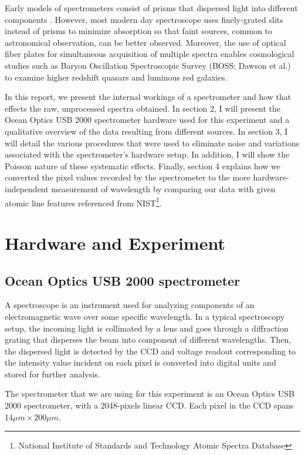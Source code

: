\documentclass[authoryear,12pt,5p,times]{elsarticle}
\begin{document}
Early models of spectrometers consist of prisms that dispersed light into different components . However, most modern day spectroscope uses finely-grated slits instead of prisms to minimize absorption so that faint sources, common to astronomical observation, can be better observed. Moreover, the use of optical fiber plates for simultaneous acquisition of multiple spectra enables cosmological studies such as Baryon Oscillation Spectroscopic Survey (BOSS; Dawson et al.) to examine higher redshift quasars and luminous red galaxies.

In this report, we present the internal workings of a spectrometer and how that effects the raw, unprocessed spectra obtained. In section 2, I will present the Ocean Optics USB 2000 spectrometer hardware used for this experiment and a qualitative overview of the data resulting from different sources. In section 3, I will detail the various procedures that were used to eliminate noise and variations associated with the spectrometer's hardware setup.  In addition, I will show the Poisson nature of these systematic effects. Finally, section 4 explains how we converted the pixel values recorded by the spectrometer to the more hardware-independent measurement of wavelength by comparing our data with given atomic line features referenced from NIST\footnote{National Institute of Standards and Technology Atomic Spectra Database}.
\section{Hardware and Experiment}
	\subsection{Ocean Optics USB 2000 spectrometer}
	A spectroscope is an instrument used for analyzing components of an electromagnetic wave over some specific wavelength. In a typical spectroscopy setup, the incoming light is collimated by a lens and goes through a diffraction grating that disperses the beam into component of different wavelengths.  Then, the dispersed light is detected by the CCD and %
voltage readout corresponding to the intensity value incident on each pixel is converted into digital units and stored for further analysis.  %

The spectrometer that we are using for this experiment is an Ocean Optics USB 2000 spectrometer, with a 2048-pixels linear CCD. Each pixel in the CCD spans 14$\mu m\times 200\mu m$.
\end{document}

